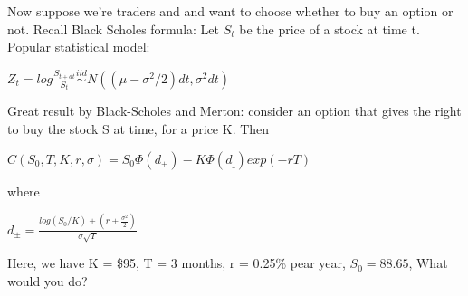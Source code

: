 \documentclass[letterpaper,10pt,english]{sphinxmanual}
\begin{document}
Now suppose we're traders and and want to choose whether to buy an option or not.
Recall Black Scholes formula: Let \(S_t\) be the price of a stock at time t.
Popular statistical model:

\(Z_t = log \frac{S_{t + dt}}{S_t} \overset{iid}{\sim} N((\mu - \sigma^2/2)dt, \sigma^2 dt)\)

Great result by Black-Scholes and Merton: consider an option that gives the right to
buy the stock S at time, for a price K. Then

\(C(S_0, T, K, r, \sigma) = S_0\Phi(d_+) - K\Phi(d_{\_})exp(-rT)\)

where

\(d_{\pm} = \frac{log(S_0/K) + (r \pm \frac{\sigma^2}{2})}{\sigma \sqrt{T}}\)

Here, we have K = \$95, T = 3 months, r = 0.25\% pear year, \(S_0 = 88.65\), What
would you do?
\end{document}
